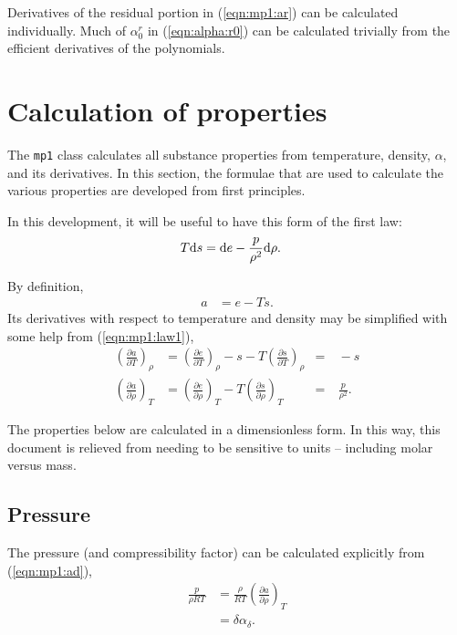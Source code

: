 Derivatives of the residual portion in (\ref{eqn:mp1:ar}) can be calculated individually.  Much of $\alpha^r_0$ in (\ref{eqn:alpha:r0}) can be calculated trivially from the efficient derivatives of the polynomials. 


\section{Calculation of properties}\label{sec:mp1:properties}

The \texttt{mp1} class calculates all substance properties from temperature, density, $\alpha$, and its derivatives.  In this section, the formulae that are used to calculate the various properties are developed from first principles.

In this development, it will be useful to have this form of the first law:
\begin{align}
T\mathrm{d} s &= \mathrm{d} e - \frac{p}{\rho^2} \mathrm{d} \rho\label{eqn:mp1:law1}.
\end{align}

By definition,
\begin{align}
a &= e - Ts \label{eqn:mp1:a}.
\end{align}
Its derivatives with respect to temperature and density may be simplified with some help from (\ref{eqn:mp1:law1}),
\begin{align}
\left(\frac{\partial a}{\partial T}\right)_\rho &= \left(\frac{\partial e}{\partial T}\right)_\rho - s - T \left(\frac{\partial s}{\partial T}\right)_\rho &=& \ -s\label{eqn:mp1:at}\\
\left(\frac{\partial a}{\partial \rho}\right)_T &= \left(\frac{\partial e}{\partial \rho}\right)_T - T \left(\frac{\partial s}{\partial \rho}\right)_T &=& \ \frac{p}{\rho^2} \label{eqn:mp1:ad}.
\end{align}

The properties below are calculated in a dimensionless form.  In this way, this document is relieved from needing to be sensitive to units -- including molar versus mass. 
 
\subsection{Pressure}\label{sec:mp1:p}

The pressure (and compressibility factor) can be calculated explicitly from (\ref{eqn:mp1:ad}),
\begin{align}
\frac{p}{\rho R T} &=  \frac{\rho}{R T}\left(\frac{\partial a}{\partial \rho}\right)_T\nonumber\\
&= \delta \alpha_\delta\label{eqn:mp1:p}.
\end{align}

